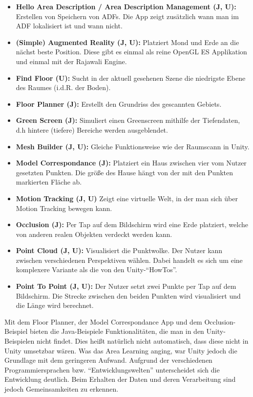 \begin{itemize}
	\item\textbf{Hello Area Description / Area Description Management (J, U):} Erstellen von Speichern von ADFs. Die App zeigt zusätzlich wann man im ADF lokalisiert ist und wann nicht.
	\item\textbf{(Simple) Augmented Reality (J, U):} Platziert Mond und Erde an die nächst beste Position. Diese gibt es einmal als reine OpenGL ES Applikation und einmal mit der Rajawali Engine.
	\item\textbf{Find Floor (U):} Sucht in der aktuell gesehenen Szene die niedrigste Ebene des Raumes (i.d.R. der Boden).
	\item\textbf{Floor Planner (J):} Erstellt den Grundriss des gescannten Gebiets.
	\item\textbf{Green Screen (J):} Simuliert einen Greenscreen mithilfe der Tiefendaten, d.h hintere (tiefere) Bereiche werden ausgeblendet.
	\item\textbf{Mesh Builder (J, U):} Gleiche Funktionsweise wie der Raumscann in Unity.
	\item\textbf{Model Correspondance (J):} Platziert ein Haus zwischen vier vom Nutzer gesetzten Punkten. Die größe des Hause hängt von der mit den Punkten markierten Fläche ab.
	\item\textbf{Motion Tracking (J, U)} Zeigt eine virtuelle Welt, in der man sich über Motion Tracking bewegen kann.
	\item\textbf{Occlusion (J):} Per Tap auf dem Bildschirm wird eine Erde platziert, welche von anderen realen Objekten verdeckt werden kann.
	\item\textbf{Point Cloud (J, U):} Visualisiert die Punktwolke. Der Nutzer kann zwischen verschiedenen Perspektiven wählen. Dabei handelt es sich um eine komplexere Variante als die von den Unity-"`HowTos"'.
	\item\textbf{Point To Point (J, U):} Der Nutzer setzt zwei Punkte per Tap auf dem Bildschirm. Die Strecke zwischen den beiden Punkten wird visualisiert und die Länge wird berechnet.
\end{itemize}

Mit dem Floor Planner, der Model Correspondance App und dem Occlusion-Beispiel bieten die Java-Beispiele Funktionalitäten, die man in den Unity-Beispielen nicht findet. Dies heißt natürlich nicht automatisch, dass diese nicht in Unity umsetzbar wären. Was das Area Learning anging, war Unity jedoch die Grundlage mit dem geringeren Aufwand. Aufgrund der verschiedenen Programmiersprachen bzw. "`Entwicklungswelten"' unterscheidet sich die Entwicklung deutlich. Beim Erhalten der Daten und deren Verarbeitung sind jedoch Gemeinsamkeiten zu erkennen.